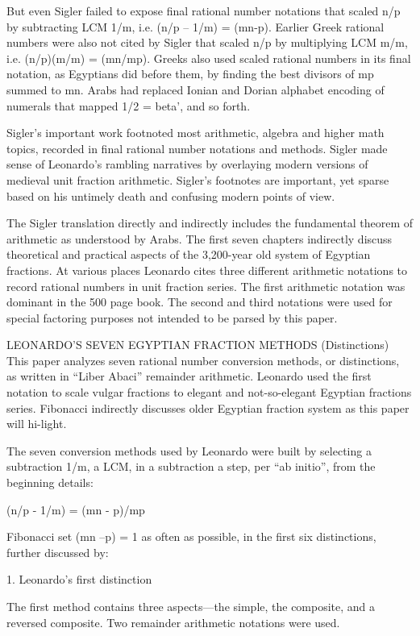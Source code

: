 \documentclass[12pt]{article}
\begin{document}
 But even Sigler failed to expose final rational number notations that scaled n/p by subtracting LCM 1/m, i.e.  (n/p – 1/m) = (mn-p).  Earlier Greek rational numbers were also not cited by Sigler that scaled n/p by multiplying LCM m/m, i.e. (n/p)(m/m) = (mn/mp). Greeks also used scaled rational numbers in its final notation, as Egyptians did before them, by finding the best divisors of mp summed to mn. Arabs had replaced Ionian and Dorian alphabet encoding of numerals that mapped 1/2  = beta’, and so forth.

Sigler's important work footnoted most arithmetic, algebra and higher math topics, recorded in final rational number notations and methods. Sigler made sense of Leonardo’s rambling narratives by overlaying modern versions of medieval unit fraction arithmetic.  Sigler's footnotes are important, yet sparse based on his untimely death and confusing modern points of view.

The Sigler translation directly and indirectly includes the fundamental theorem of arithmetic as understood by Arabs. The first seven chapters indirectly discuss theoretical and practical aspects of the 3,200-year old system of Egyptian fractions. At various places Leonardo cites three different arithmetic notations to record rational numbers in unit fraction series. The first arithmetic notation was dominant in the 500 page book. The second and third notations were used for special factoring purposes not intended to be parsed by this paper.

LEONARDO'S SEVEN EGYPTIAN FRACTION METHODS (Distinctions)
This paper analyzes seven rational number conversion methods, or distinctions, as written in “Liber Abaci”  remainder arithmetic. Leonardo used the first notation to scale vulgar fractions to elegant and not-so-elegant Egyptian fractions series. Fibonacci indirectly discusses older Egyptian fraction system as this paper will hi-light.

The seven conversion methods used by Leonardo were built by selecting a subtraction 1/m, a LCM, in a subtraction a step, per “ab initio”, from the beginning details:

(n/p - 1/m) = (mn - p)/mp

 Fibonacci set  (mn –p) = 1 as often as possible, in the first six distinctions, further discussed by:

1. Leonardo’s first distinction

The first method contains three aspects—the simple, the  composite,  and a reversed composite. Two remainder arithmetic notations were used.
\end{document}
